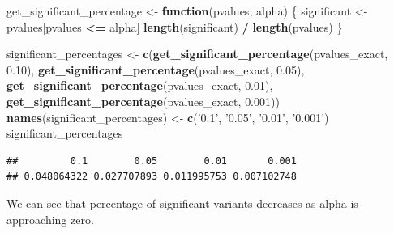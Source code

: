 \documentclass[
]{article}
\newenvironment{Shaded}{\begin{snugshade}}{\end{snugshade}}
\newcommand{\ControlFlowTok}[1]{\textcolor[rgb]{0.13,0.29,0.53}{\textbf{#1}}}
\newcommand{\FloatTok}[1]{\textcolor[rgb]{0.00,0.00,0.81}{#1}}
\newcommand{\KeywordTok}[1]{\textcolor[rgb]{0.13,0.29,0.53}{\textbf{#1}}}
\newcommand{\NormalTok}[1]{#1}
\newcommand{\OperatorTok}[1]{\textcolor[rgb]{0.81,0.36,0.00}{\textbf{#1}}}
\newcommand{\StringTok}[1]{\textcolor[rgb]{0.31,0.60,0.02}{#1}}
\begin{document}
\begin{Shaded}
\begin{Highlighting}[]
\NormalTok{get_significant_percentage <-}\StringTok{ }\ControlFlowTok{function}\NormalTok{(pvalues, alpha) \{}
\NormalTok{  significant <-}\StringTok{ }\NormalTok{pvalues[pvalues }\OperatorTok{<=}\StringTok{ }\NormalTok{alpha]}
  \KeywordTok{length}\NormalTok{(significant) }\OperatorTok{/}\StringTok{ }\KeywordTok{length}\NormalTok{(pvalues)}
\NormalTok{\}}

\NormalTok{significant_percentages <-}\StringTok{ }\KeywordTok{c}\NormalTok{(}\KeywordTok{get_significant_percentage}\NormalTok{(pvalues_exact, }\FloatTok{0.10}\NormalTok{),}
                             \KeywordTok{get_significant_percentage}\NormalTok{(pvalues_exact, }\FloatTok{0.05}\NormalTok{),}
                             \KeywordTok{get_significant_percentage}\NormalTok{(pvalues_exact, }\FloatTok{0.01}\NormalTok{),}
                             \KeywordTok{get_significant_percentage}\NormalTok{(pvalues_exact, }\FloatTok{0.001}\NormalTok{))}
\KeywordTok{names}\NormalTok{(significant_percentages) <-}\StringTok{ }\KeywordTok{c}\NormalTok{(}\StringTok{'0.1'}\NormalTok{, }\StringTok{'0.05'}\NormalTok{, }\StringTok{'0.01'}\NormalTok{, }\StringTok{'0.001'}\NormalTok{)}
\NormalTok{significant_percentages}
\end{Highlighting}
\end{Shaded}

\begin{verbatim}
##         0.1        0.05        0.01       0.001 
## 0.048064322 0.027707893 0.011995753 0.007102748
\end{verbatim}

We can see that percentage of significant variants decreases as alpha is
approaching zero.
\end{document}
